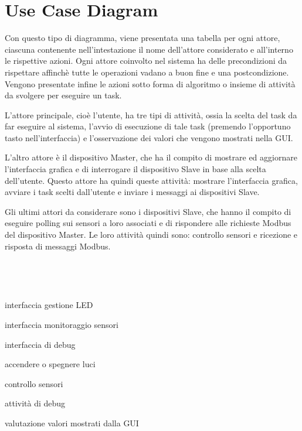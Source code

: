 \documentclass[a4paper,titlepage]{book}
\begin{document}
\newpage

\section{Use Case Diagram}

Con questo tipo di diagramma, viene presentata una tabella per ogni attore, ciascuna contenente nell'intestazione il nome dell'attore considerato e all'interno le rispettive azioni. Ogni attore coinvolto nel sistema ha delle precondizioni da rispettare affinchè tutte le operazioni vadano a buon fine e una postcondizione. Vengono presentate infine le azioni sotto forma di algoritmo o insieme di attività da svolgere per eseguire un task.

L'attore principale, cioè l'utente, ha tre tipi di attività, ossia la scelta del task da far eseguire al sistema, l'avvio di esecuzione di tale task (premendo l'opportuno tasto nell'interfaccia) e l'osservazione dei valori che vengono mostrati nella GUI.

L'altro attore è il dispositivo Master, che ha il compito di mostrare ed aggiornare l'interfaccia grafica e di interrogare il dispositivo Slave in base alla scelta dell'utente. Questo attore ha quindi queste attività: mostrare l'interfaccia grafica, avviare i task scelti dall'utente e inviare i messaggi ai dispositivi Slave.

Gli ultimi attori da considerare sono i dispositivi Slave, che hanno il compito di eseguire polling sui sensori a loro associati e di rispondere alle richieste Modbus del dispositivo Master. Le loro attività quindi sono: controllo sensori e ricezione e risposta di messaggi Modbus.

~

~

\begin{usecase}
  	{\item interfaccia gestione LED
                             	\item interfaccia monitoraggio sensori
				\item interfaccia di debug}

  	{\item accendere o spegnere luci
                             	\item controllo sensori
				\item attività di debug}

  	{\item valutazione valori mostrati dalla GUI}

\end{usecase}
\end{document}
